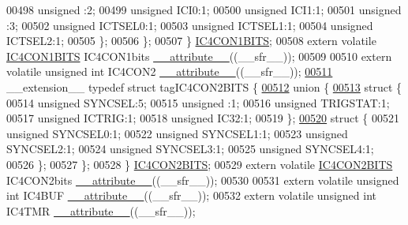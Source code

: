 \begin{DoxyCode}
00498       \textcolor{keywordtype}{unsigned} :2;
00499       \textcolor{keywordtype}{unsigned} ICI0:1;
00500       \textcolor{keywordtype}{unsigned} ICI1:1;
00501       \textcolor{keywordtype}{unsigned} :3;
00502       \textcolor{keywordtype}{unsigned} ICTSEL0:1;
00503       \textcolor{keywordtype}{unsigned} ICTSEL1:1;
00504       \textcolor{keywordtype}{unsigned} ICTSEL2:1;
00505     \};
00506   \};
00507 \} \hyperlink{a00014_d9/d4a/a00479}{IC4CON1BITS};
00508 \textcolor{keyword}{extern} \textcolor{keyword}{volatile} \hyperlink{a00014_d9/d4a/a00479}{IC4CON1BITS} IC4CON1bits \hyperlink{a00015_a493c46f03454991ccc5aa7a6e1dfb2a7}{\_\_attribute\_\_}((\_\_sfr\_\_));
00509 
00510 \textcolor{keyword}{extern} \textcolor{keyword}{volatile} \textcolor{keywordtype}{unsigned} \textcolor{keywordtype}{int}  IC4CON2 \hyperlink{a00015_a493c46f03454991ccc5aa7a6e1dfb2a7}{\_\_attribute\_\_}((\_\_sfr\_\_));
\hypertarget{a00015_source_l00511}{}\hyperlink{a00014}{00511} \_\_extension\_\_ \textcolor{keyword}{typedef} \textcolor{keyword}{struct }tagIC4CON2BITS \{
\hypertarget{a00015_source_l00512}{}\hyperlink{a00015}{00512}   \textcolor{keyword}{union }\{
\hypertarget{a00015_source_l00513}{}\hyperlink{a00015}{00513}     \textcolor{keyword}{struct }\{
00514       \textcolor{keywordtype}{unsigned} SYNCSEL:5;
00515       \textcolor{keywordtype}{unsigned} :1;
00516       \textcolor{keywordtype}{unsigned} TRIGSTAT:1;
00517       \textcolor{keywordtype}{unsigned} ICTRIG:1;
00518       \textcolor{keywordtype}{unsigned} IC32:1;
00519     \};
\hypertarget{a00015_source_l00520}{}\hyperlink{a00015}{00520}     \textcolor{keyword}{struct }\{
00521       \textcolor{keywordtype}{unsigned} SYNCSEL0:1;
00522       \textcolor{keywordtype}{unsigned} SYNCSEL1:1;
00523       \textcolor{keywordtype}{unsigned} SYNCSEL2:1;
00524       \textcolor{keywordtype}{unsigned} SYNCSEL3:1;
00525       \textcolor{keywordtype}{unsigned} SYNCSEL4:1;
00526     \};
00527   \};
00528 \} \hyperlink{a00014_db/d8e/a00482}{IC4CON2BITS};
00529 \textcolor{keyword}{extern} \textcolor{keyword}{volatile} \hyperlink{a00014_db/d8e/a00482}{IC4CON2BITS} IC4CON2bits \hyperlink{a00015_a493c46f03454991ccc5aa7a6e1dfb2a7}{\_\_attribute\_\_}((\_\_sfr\_\_));
00530 
00531 \textcolor{keyword}{extern} \textcolor{keyword}{volatile} \textcolor{keywordtype}{unsigned} \textcolor{keywordtype}{int}  IC4BUF \hyperlink{a00015_a493c46f03454991ccc5aa7a6e1dfb2a7}{\_\_attribute\_\_}((\_\_sfr\_\_));
00532 \textcolor{keyword}{extern} \textcolor{keyword}{volatile} \textcolor{keywordtype}{unsigned} \textcolor{keywordtype}{int}  IC4TMR \hyperlink{a00015_a493c46f03454991ccc5aa7a6e1dfb2a7}{\_\_attribute\_\_}((\_\_sfr\_\_));

\end{DoxyCode}
